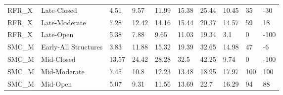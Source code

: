 \begin{sidewaystable}[!htbp]
\begin{tabular}{@{}llllllllll@{}}
\small RFR\_X                   & Late-Closed              & 4.51            & 9.57             & 11.99            & 15.38            & 25.44             & 10.\small 45                                                              & 35                                                               & -\small 30                                                                \\
\small RFR\_X                   & Late-Moderate            & 7.28            & 12.42            & 14.16            & 15.44            & 20.37             & 14.\small 57                                                              & 59                                                               & \small 18                                                                 \\
\small RFR\_X                   & Late-Open                & 5.38            & 7.88             & 9.65             & 11.03            & 19.34             & 3.\small 1                                                                & 0                                                                & -\small 100                                                               \\
\small SMC\_M                   & Early-All Structures     & 3.83            & 11.88            & 15.32            & 19.39            & 32.65             & 14.\small 98                                                              & 47                                                               & -\small 6                                                                 \\
\small SMC\_M                   & Mid-Closed               & 13.57           & 24.42            & 28.28            & 32.5             & 42.25             & 9.\small 74                                                               & 0                                                                & -\small 100                                                               \\
\small SMC\_M                   & Mid-Moderate             & 7.45            & 10.8             & 12.23            & 13.48            & 18.95             & 17.\small 97                                                              & 100                                                              & \small 100                                                                \\
\small SMC\_M                   & Mid-Open                 & 5.07            & 9.31             & 11.56            & 13.69            & 22.7              & 16.\small 29                                                              & 94                                                               & \small 88                                                                 \\

\end{tabular}
\end{sidewaystable}
